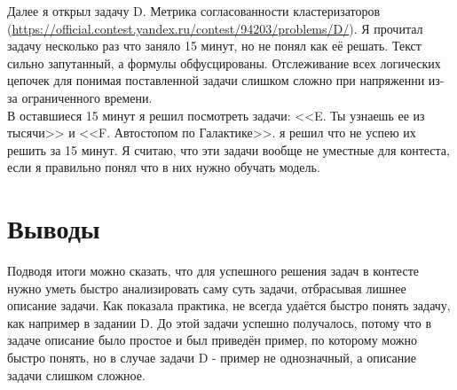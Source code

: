 \documentclass[oneside,a4paper,14pt]{extarticle} %
\begin{document}
  Далее я открыл задачу D. Метрика согласованности кластеризаторов
  (\url{https://official.contest.yandex.ru/contest/94203/problems/D/}).
  Я прочитал задачу несколько раз что заняло 15 минут, но не понял как её решать. Текст сильно
  запутанный, а формулы обфусцированы. Отслеживание всех логических цепочек для понимая поставленной
  задачи слишком сложно при напряженни из-за ограниченного времени. \\

  В оставшиеся 15 минут я решил посмотреть задачи: <<E. Ты узнаешь ее из тысячи>>
  и <<F. Автостопом по Галактике>>. я решил что не успею их решить за 15 минут. Я считаю, что эти
  задачи вообще не уместные для контеста, если я правильно понял что в них нужно обучать модель.

  \section*{Выводы}
  Подводя итоги можно сказать, что для успешного решения задач в контесте нужно уметь быстро 
  анализировать саму суть задачи, отбрасывая лишнее описание задачи. Как показала практика, не
  всегда удаётся быстро понять задачу, как например в задании D. До этой задачи успешно получалось,
  потому что в задаче описание было простое и был приведён пример, по которому можно быстро понять,
  но в случае задачи D - пример не однозначный, а описание задачи слишком сложное.
\end{document}
